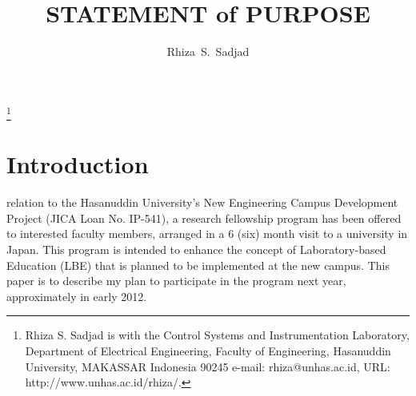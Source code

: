 \documentclass[journal]{IEEEtran}
\begin{document}
\title{STATEMENT of PURPOSE}
\author{Rhiza~S.~Sadjad}
\thanks{Rhiza S. Sadjad is with the Control Systems and Instrumentation Laboratory, 
Department of Electrical Engineering, Faculty of Engineering, Hasanuddin University, 
MAKASSAR Indonesia 90245
e-mail: rhiza@unhas.ac.id, URL: http://www.unhas.ac.id/rhiza/.}
\maketitle
\section{Introduction}
 relation to the Hasanuddin University's New Engineering Campus Development Project (JICA Loan No. IP-541), a research fellowship program has been offered to interested faculty members, arranged in a 6 (six) month visit to a university in Japan. This program is intended to enhance the concept of Laboratory-based Education (LBE) that is planned to be implemented at the new campus. This paper is to describe my plan to participate in the program next year, approximately in early 2012.
\end{document}
